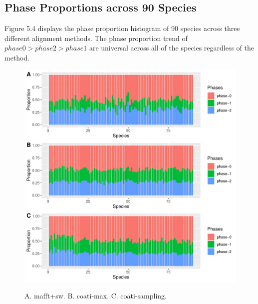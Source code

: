 \subsection{Phase Proportions across 90 Species}
Figure 5.4 displays the phase proportion histogram of 90 species across three different alignment methods. The phase proportion trend of  $phase 0 > phase 2 > phase 1$ are universal across all of the species regardless of the method. \\
\begin{figure}[H]
     \centering
     \begin{minipage}[t]{1\textwidth}
     \includegraphics[width=1\linewidth,height=1.1\linewidth]{Fig4.pdf}
     { {A. mafft+sw. B. coati-max. C. coati-sampling.} 
 \par}
     \end{minipage}
\end{figure}

